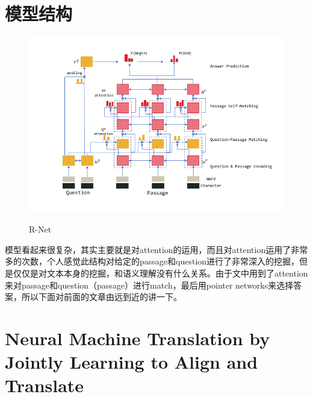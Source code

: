 \documentclass[UTF8]{article}
\begin{document}
\section{模型结构}
\begin{figure}[htpb]
    \centering
    \includegraphics[width=0.8\linewidth]{r-net.png}
    \label{fig:R-Net}
    \caption{R-Net}
\end{figure}

模型看起来很复杂，其实主要就是对attention的运用，而且对attention运用了非常多的次数，个人感觉此结构对给定的passage和question进行了非常深入的挖掘，但是仅仅是对文本本身的挖掘，和语义理解没有什么关系。由于文中用到了attention来对passage和question（passage）进行match，最后用pointer networks来选择答案，所以下面对前面的文章由远到近的讲一下。
\section{Neural Machine Translation by Jointly Learning to Align and Translate}
\end{document}
